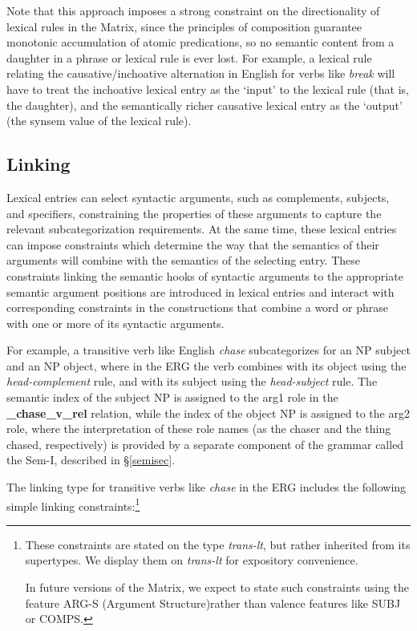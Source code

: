 \documentclass[12pt]{article}
\newcommand{\fn}{\footnote}
\begin{document}
Note that this approach imposes a strong constraint on the
directionality of lexical rules in the Matrix, since the principles of
composition guarantee monotonic accumulation of atomic predications,
so no semantic content from a daughter in a phrase or lexical rule is
ever lost.  For example, a lexical rule relating the
causative/inchoative alternation in English for verbs like {\it break}
will have to treat the inchoative lexical entry as the `input' to the
lexical rule (that is, the daughter), and the semantically richer
causative lexical entry as the `output' (the {\sc synsem} value of the
lexical rule).


\subsection{Linking}
\label{linksec}

Lexical entries can select syntactic arguments, such as complements, subjects,
and specifiers, constraining the properties of these arguments to capture the
relevant subcategorization requirements.  At the same time, these lexical
entries can impose constraints which determine the way that the semantics of 
their arguments will combine with the semantics of the selecting entry.
These constraints linking the semantic hooks of syntactic arguments to the
appropriate semantic argument positions are introduced in lexical entries
and interact with corresponding constraints in the constructions
that combine a word or phrase with one or more of its syntactic arguments.

For example, a transitive verb like English {\it chase} subcategorizes for an 
NP subject and an NP object, where in the ERG the verb combines with its 
object using the {\it head-complement} rule, and with its subject using the
{\it head-subject} rule.  The semantic index of the subject NP is assigned
to the {\sc arg1} role in the {\bf \_chase\_v\_rel} relation, while the index of
the object NP is assigned to the {\sc arg2} role, where the interpretation
of these role names (as the chaser and the thing chased, respectively) is
provided by a separate component of the grammar called the Sem-I, described
in \S\ref{semisec}.

The linking type for transitive verbs like {\it chase} in the ERG includes the 
following simple linking constraints:\fn{These \label{argsfn}constraints are stated
on the type {\it trans-lt}, but rather inherited from its supertypes.  We
display them on {\it trans-lt} for expository convenience.

In future versions of the Matrix,
we expect to state such constraints using the feature ARG-S (Argument Structure)rather than valence features like SUBJ or COMPS.}
\end{document}
